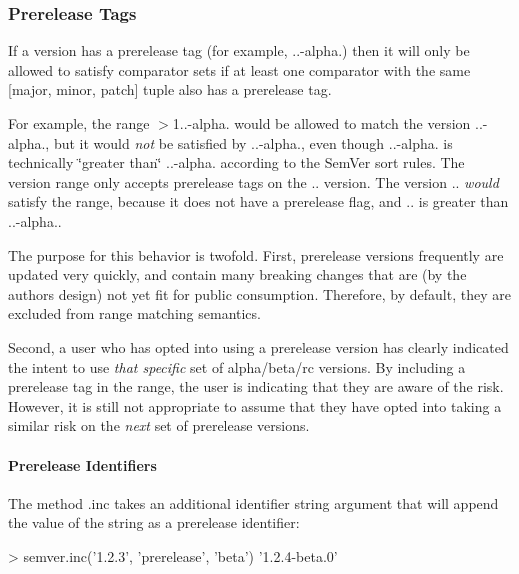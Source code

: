 \subsubsection*{Prerelease Tags}

If a version has a prerelease tag (for example, {..-\/alpha.}) then it will only be allowed to satisfy comparator sets if at least one comparator with the same {\ttfamily \mbox{[}major, minor, patch\mbox{]}} tuple also has a prerelease tag.

For example, the range {\ttfamily $>$1..-\/alpha.} would be allowed to match the version {..-\/alpha.}, but it would {\itshape not} be satisfied by {..-\/alpha.}, even though {..-\/alpha.} is technically \char`\"{}greater
than\char`\"{} {..-\/alpha.} according to the Sem\+Ver sort rules. The version range only accepts prerelease tags on the {..} version. The version {..} {\itshape would} satisfy the range, because it does not have a prerelease flag, and {..} is greater than {..-\/alpha.}.

The purpose for this behavior is twofold. First, prerelease versions frequently are updated very quickly, and contain many breaking changes that are (by the author\textquotesingle{}s design) not yet fit for public consumption. Therefore, by default, they are excluded from range matching semantics.

Second, a user who has opted into using a prerelease version has clearly indicated the intent to use {\itshape that specific} set of alpha/beta/rc versions. By including a prerelease tag in the range, the user is indicating that they are aware of the risk. However, it is still not appropriate to assume that they have opted into taking a similar risk on the {\itshape next} set of prerelease versions.

\paragraph*{Prerelease Identifiers}

The method {\ttfamily .inc} takes an additional {\ttfamily identifier} string argument that will append the value of the string as a prerelease identifier\+:


\begin{DoxyCode}
> semver.inc('1.2.3', 'prerelease', 'beta')
'1.2.4-beta.0'
\end{DoxyCode}


